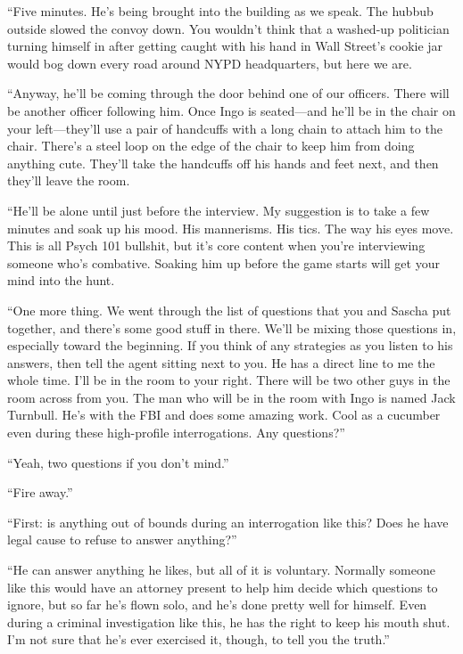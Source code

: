 \documentclass[12pt]{book}
\begin{document}
``Five minutes.  He's being brought into the building as we speak.  The hubbub outside slowed the convoy down.  You wouldn't think that a washed-up politician turning himself in after getting caught with his hand in Wall Street's cookie jar would bog down every road around NYPD headquarters, but here we are.

``Anyway, he'll be coming through the door behind one of our officers.  There will be another officer following him.  Once Ingo is seated---and he'll be in the chair on your left---they'll use a pair of handcuffs with a long chain to attach him to the chair.  There's a steel loop on the edge of the chair to keep him from doing anything cute.  They'll take the handcuffs off his hands and feet next, and then they'll leave the room.

``He'll be alone until just before the interview.  My suggestion is to take a few minutes and soak up his mood.  His mannerisms.  His tics.  The way his eyes move.  This is all Psych 101 bullshit, but it's core content when you're interviewing someone who's combative.  Soaking him up before the game starts will get your mind into the hunt.

``One more thing.  We went through the list of questions that you and Sascha put together, and there's some good stuff in there.  We'll be mixing those questions in, especially toward the beginning.  If you think of any strategies as you listen to his answers, then tell the agent sitting next to you.  He has a direct line to me the whole time.  I'll be in the room to your right.  There will be two other guys in the room across from you.  The man who will be in the room with Ingo is named Jack Turnbull.  He's with the FBI and does some amazing work.  Cool as a cucumber even during these high-profile interrogations.  Any questions?''

``Yeah, two questions if you don't mind.''

``Fire away.''

``First: is anything out of bounds during an interrogation like this?  Does he have legal cause to refuse to answer anything?''

``He can answer anything he likes, but all of it is voluntary.  Normally someone like this would have an attorney present to help him decide which questions to ignore, but so far he's flown solo, and he's done pretty well for himself.  Even during a criminal investigation like this, he has the right to keep his mouth shut.  I'm not sure that he's ever exercised it, though, to tell you the truth.''
\end{document}
